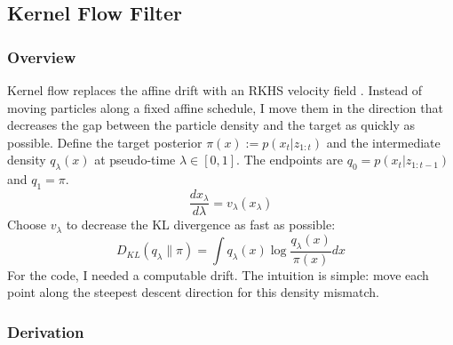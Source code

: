 \documentclass{article}
\begin{document}
\clearpage
\subsection{Kernel Flow Filter}

\subsubsection{Overview}
Kernel flow replaces the affine drift with an RKHS velocity field \cite{Pulido2019,HuVanLeeuwen2021}. Instead of moving particles along a fixed affine schedule, I move them in the direction that decreases the gap between the particle density and the target as quickly as possible.
Define the target posterior $\pi(x) := p(x_t | z_{1:t})$ and the intermediate density $q_\lambda(x)$ at pseudo-time $\lambda \in [0,1]$. The endpoints are $q_0 = p(x_t | z_{1:t-1})$ and $q_1 = \pi$.
\begin{equation}
\frac{dx_\lambda}{d\lambda} = v_\lambda(x_\lambda)
\end{equation}
Choose $v_\lambda$ to decrease the KL divergence as fast as possible:
\begin{equation}
D_{KL}(q_\lambda \| \pi) = \int q_\lambda(x) \log \frac{q_\lambda(x)}{\pi(x)} dx
\end{equation}
For the code, I needed a computable drift. The intuition is simple: move each point along the steepest descent direction for this density mismatch.

  



\subsubsection{Derivation}




\end{document}
